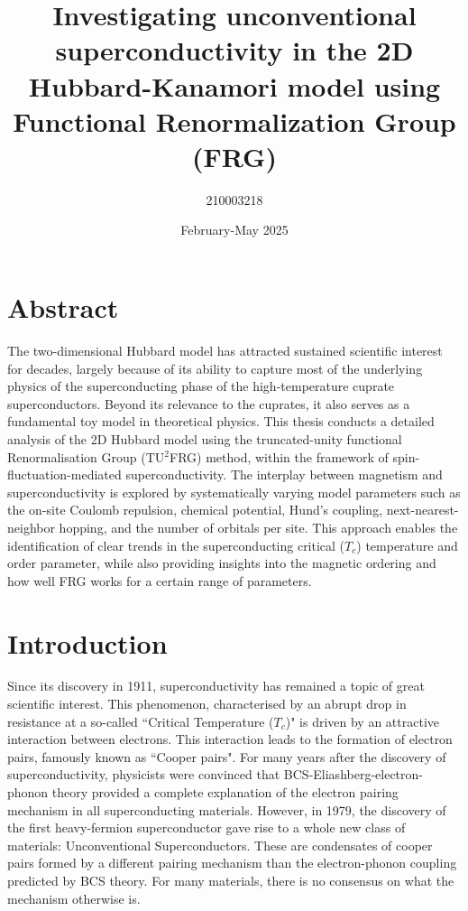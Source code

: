 \documentclass[12pt]{article}
\title{Investigating unconventional superconductivity in the 2D Hubbard-Kanamori model using Functional Renormalization Group (FRG)}
\author{210003218}
\date{February-May 2025}
\begin{document}
\maketitle
\tableofcontents 

\newpage 

\section{Abstract}



The two-dimensional Hubbard model has attracted sustained scientific interest for decades, largely because of its ability to capture most of the underlying physics of the superconducting phase of the high-temperature cuprate superconductors\cite{dagotto1994correlated}. 
Beyond its relevance to the cuprates, it also serves as a fundamental toy model in theoretical physics. 
This thesis conducts a detailed analysis of the 2D Hubbard model using the truncated-unity functional Renormalisation Group (TU$^2$FRG) method,
within the framework of spin-fluctuation-mediated superconductivity.  The interplay between magnetism and superconductivity is explored 
by systematically varying model parameters such as the on-site Coulomb repulsion, chemical potential, Hund's coupling, next-nearest-neighbor hopping, and the number of orbitals per
site. This approach enables the identification of clear trends in the superconducting critical ($T_c$) temperature and order parameter, while also
providing insights into the magnetic ordering and how well FRG works for a certain range of parameters.





\section{Introduction}

Since its discovery in 1911\cite{onnes1911superconductivity}, superconductivity has remained a topic of great scientific interest.
This phenomenon, characterised by an abrupt drop in resistance at a so-called ``Critical Temperature ($T_c$)"\cite{geballe2015tc} is driven by an attractive interaction
between electrons. This  interaction leads to the formation of electron pairs, famously known as ``Cooper pairs"\cite{schrieffer2018theory}. For many 
years after the discovery of superconductivity, physicists
were convinced that BCS-Eliashberg-electron-phonon theory \cite{schrieffer2018theory} provided a complete explanation of the electron pairing mechanism in all superconducting materials. 
However, in 1979, the discovery of the first heavy-fermion superconductor\cite{steglich1979superconductivity} gave rise to a whole new class of materials: Unconventional Superconductors. 
These are condensates of cooper pairs formed by a different pairing mechanism than the electron-phonon coupling predicted by BCS theory\cite{hirsch2015superconducting}.
For many materials, there is no consensus on what the mechanism otherwise is.\par
\end{document}
